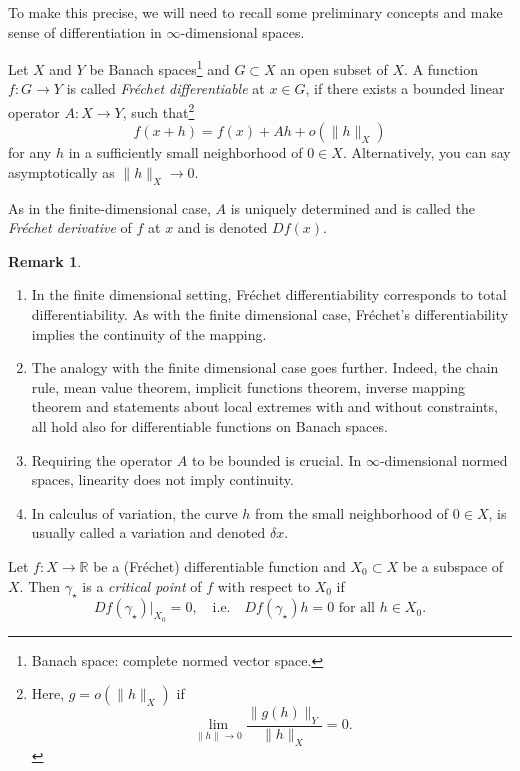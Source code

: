\documentclass[english,fontsize=11pt,paper=b5]{scrbook}
\theoremstyle{definition}
\newtheorem{remark}{Remark}[chapter]
\begin{document}
  To make this precise, we will need to recall some preliminary concepts and make sense of differentiation in $\infty$-dimensional spaces.

  Let $X$ and $Y$ be Banach spaces\footnote{Banach space: complete normed vector space.}  and $G\subset X$ an open subset of $X$.
  A function $f: G \to Y$ is called \emph{Fr\'echet differentiable} at $x\in G$, if there exists a bounded linear operator $A: X \to Y$, such that\footnote{Here, $g = o(\|h\|_X)$ if
    \begin{equation}
      \lim_{\|h\| \to 0} \frac{\|g(h)\|_Y}{\|h\|_X} = 0.
    \end{equation}
  }
  \begin{equation}\label{eq:frechetdiff}
    f(x+h) = f(x) + Ah + o(\|h\|_X)
  \end{equation}
  for any $h$ in a sufficiently small neighborhood of $0\in X$. Alternatively, you can say asymptotically as $\|h\|_X\to 0$.

  As in the finite-dimensional case, $A$ is uniquely determined and is called the \emph{Fr\'echet derivative} of $f$ at $x$ and is denoted $D f(x)$.

  \begin{remark}
    \begin{enumerate}
      \item In the finite dimensional setting, Fr\'echet differentiability corresponds to total differentiability. As with the finite dimensional case, Fr\'echet's differentiability implies the continuity of the mapping.
      \item The analogy with the finite dimensional case goes further. Indeed, the chain rule, mean value theorem, implicit functions theorem, inverse mapping theorem and statements about local extremes with and without constraints, all hold also for differentiable functions on Banach spaces.
      \item Requiring the operator $A$ to be bounded is crucial. In $\infty$-dimensional normed spaces, linearity does not imply continuity.
      \item In calculus of variation, the curve $h$ from the small neighborhood of $0\in X$, is usually called a variation and denoted $\delta x$.
    \end{enumerate}
  \end{remark}

  Let $f: X \to \mathbb{R}$ be a (Fr\'echet) differentiable function and $X_0 \subset X$ be a subspace of $X$. Then $\gamma_\star$ is a \emph{critical point} of $f$ with respect to $X_0$ if
  \begin{equation}
    Df(\gamma_\star)\Big|_{X_0} = 0, \quad\mbox{i.e.}\quad
    Df(\gamma_\star)h = 0 \mbox{ for all } h\in X_0.
  \end{equation}
\end{document}
